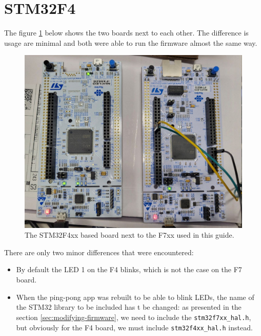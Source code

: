\documentclass[10pt]{article}
\begin{document}
\pagebreak

\section{STM32F4}
\label{appendix:stm32f4}
The figure \ref{fig:f4} below shows the two boards next to each other. The difference is usage are minimal and both were able to run the firmware almost the same way.

\begin{figure}[h]
  \centering
  \includegraphics[width=.8\textwidth]{./img/f4.jpg}
  \caption{The STM32F4xx based board next to the F7xx used in this guide.}
  \label{fig:f4}
\end{figure}

There are only two minor differences that were encountered:
\begin{itemize}
\item By default the LED 1 on the F4 blinks, which is not the case on the F7 board.
\item When the ping-pong app was rebuilt to be able to blink LEDs, the name of the STM32 library to be included has t be changed: as presented in the section \ref{sec:modifying-firmware}, we need to include the \verb|stm32f7xx_hal.h|, but obviously for the F4 board, we must include \verb|stm32f4xx_hal.h| instead.
\end{itemize}
\end{document}
